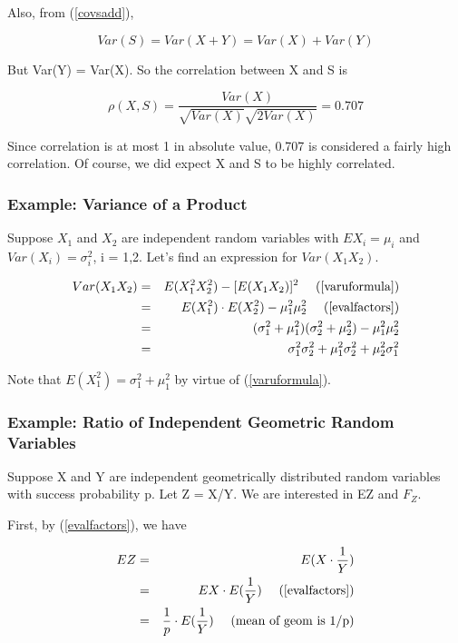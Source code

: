 Also, from (\ref{covsadd}),

\begin{equation}
Var(S) =  Var(X+Y) = Var(X) + Var(Y)
\end{equation}

But Var(Y) = Var(X).  So the correlation between X and S is

\begin{equation}
\rho(X,S) = \frac{Var(X)}
{\sqrt{Var(X)} \sqrt{2Var(X)}} = 0.707
\end{equation}

Since correlation is at most 1 in absolute value, 0.707 is considered a
fairly high correlation.  Of course, we did expect X and S to be highly
correlated.

\subsubsection{Example:  Variance of a Product}

Suppose $X_1$ and $X_2$ are independent random variables with $EX_i =
\mu_i$ and $Var(X_i) = \sigma^2_i$, i = 1,2.  Let's find an expression
for $Var(X_1 X_2)$.

\begin{eqnarray}
Var(X_1 X_2) &=& E(X^2_1 X^2_2) - [E(X_1 X_2)]^2 ~~~~ 
   \textrm{(\ref{varuformula})}  \\ 
&=& E(X^2_1) \cdot E(X^2_2) - \mu^2_1 \mu^2_2 
   ~~~~ \textrm{(\ref{evalfactors})} \\
&=& (\sigma^2_1 + \mu^2_1) (\sigma^2_2 + \mu^2_2) - \mu^2_1 \mu^2_2 \\
&=& \sigma^2_1 \sigma^2_2 
+ \mu^2_1 \sigma^2_2
+ \mu^2_2 \sigma^2_1
\end{eqnarray}

Note that $E(X^2_1) = \sigma^2_1 + \mu^2_1$ by virtue of
(\ref{varuformula}).

\subsubsection{Example:  Ratio of Independent Geometric Random Variables}

Suppose X and Y are independent geometrically distributed
random variables with success probability p.  Let Z = X/Y.  We are
interested in EZ and $F_Z$.

First, by (\ref{evalfactors}), we have

\begin{eqnarray}
EZ &=& E(X \cdot \frac{1}{Y}) \\ 
&=& EX \cdot E(\frac{1}{Y}) ~~~~ (\ref{evalfactors}) \\ 
&=& \frac{1}{p} \cdot E(\frac{1}{Y}) ~~~~ \textrm{(mean of geom is 1/p)} 
\end{eqnarray}

